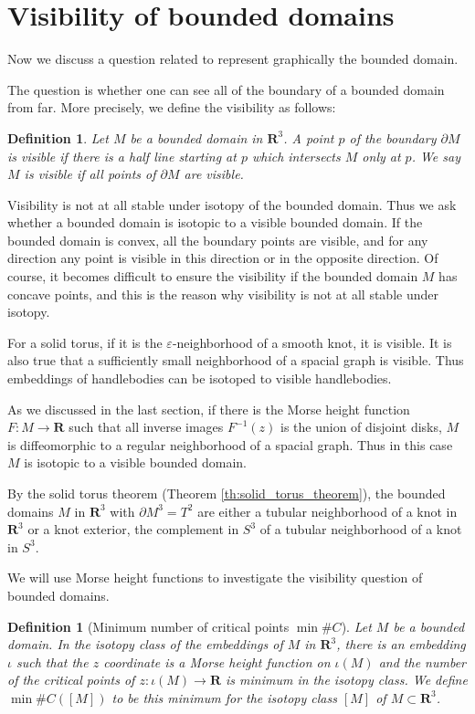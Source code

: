 \documentclass{amsart}
\newtheorem{definition}[theorem]{Definition}
\numberwithin{equation}{section}
\newcommand{\RR}{{\boldsymbol{R}}}
\newcommand{\lra}{\longrightarrow}
\newcommand{\bd}{\partial}
\begin{document}
\section{Visibility of bounded domains}
\label{sec:visibility}
Now we discuss a question related to represent graphically the bounded domain.

The question is whether one can see all of the boundary of a bounded domain from far.
More precisely, we define the visibility as follows:

\begin{definition}
Let $M$ be a bounded domain in $\RR^3$.
A point $p$ of the boundary $\bd M$ is visible if
 there is a half line starting at $p$ which intersects $M$ only at $p$. 
We say $M$ is visible if all points of $\bd M$ are visible. 
\end{definition}

Visibility is not at all stable under isotopy of the bounded domain.
Thus we ask whether a bounded domain is isotopic to a visible bounded domain. 
If the bounded domain is convex, all the boundary points are visible, and for any direction any point is visible in this direction or in the opposite direction. Of course, it becomes difficult to ensure the visibility if the bounded domain $M$ has concave points, and this is the reason why visibility is not at all stable under isotopy.

For a solid torus, if it is the $\varepsilon$-neighborhood of a smooth knot, it is visible.
It is also true that a sufficiently small neighborhood of a spacial graph is visible. Thus embeddings of handlebodies can be isotoped to visible handlebodies.


As we discussed in the last section, if there is the Morse height function $F:M\lra \RR$ such that all inverse images $F^{-1}(z)$ is the union of disjoint disks, $M$ is diffeomorphic to a regular neighborhood of a spacial graph. Thus in this case  $M$  is isotopic to a visible bounded domain.

By the solid torus theorem (Theorem \ref{th:solid_torus_theorem}), the bounded domains $M$ in $\RR^3$ with $\bd M^3=T^2$  are either a tubular neighborhood of a knot in $\RR^3$ or a knot exterior, the complement in $S^3$ of a tubular neighborhood of a knot in $S^3$.

We will use Morse height functions to investigate the visibility question of bounded domains.

\begin{definition}[Minimum number of critical points $\min\#C$]
Let $M$ be a bounded domain. In the isotopy class of the embeddings of $M$ in $\RR^3$, there is an embedding $\iota$ such that the $z$ coordinate is a Morse height function on $\iota(M)$ and the number of the critical points of $z:\iota(M)\lra \RR$ is minimum in 
the isotopy class. We define $\min\#C([M])$ to be this minimum for the isotopy class $[M]$ of $M\subset \RR^3$.
\end{definition}
\end{document}
